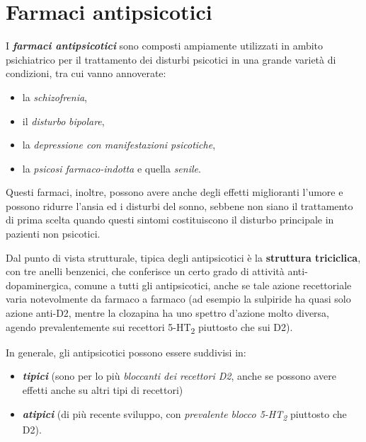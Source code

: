 \section{Farmaci antipsicotici}

I \textbf{\emph{farmaci antipsicotici}} sono composti ampiamente
utilizzati in ambito psichiatrico per il trattamento dei disturbi
psicotici in una grande varietà di condizioni, tra cui vanno annoverate:

\begin{itemize}
\item
  la \emph{schizofrenia},
\item
  il \emph{disturbo} \emph{bipolare},
\item
  la \emph{depressione con manifestazioni psicotiche},
\item
  la \emph{psicosi farmaco-indotta} e quella \emph{senile}.
\end{itemize}

Questi farmaci, inoltre, possono avere anche degli effetti miglioranti
l'umore e possono ridurre l'ansia ed i disturbi del sonno, sebbene non
siano il trattamento di prima scelta quando questi sintomi costituiscono
il disturbo principale in pazienti non psicotici.

Dal punto di vista strutturale, tipica degli antipsicotici è la
\textbf{struttura triciclica}, con tre anelli benzenici, che conferisce
un certo grado di attività anti-dopaminergica, comune a tutti gli
antipsicotici, anche se tale azione recettoriale varia notevolmente da
farmaco a farmaco (ad esempio la sulpiride ha quasi solo azione anti-D2,
mentre la clozapina ha uno spettro d'azione molto diversa, agendo
prevalentemente sui recettori 5-HT\textsubscript{2} piuttosto che sui
D2).

In generale, gli antipsicotici possono essere suddivisi in:

\begin{itemize}
\item
  \textbf{\emph{tipici}} (sono per lo più \emph{bloccanti dei recettori
  D2}, anche se possono avere effetti anche su altri tipi di recettori)
\item
  \textbf{\emph{atipici}} (di più recente sviluppo, con \emph{prevalente
  blocco 5-HT\textsubscript{2}} piuttosto che D2).
\end{itemize}

